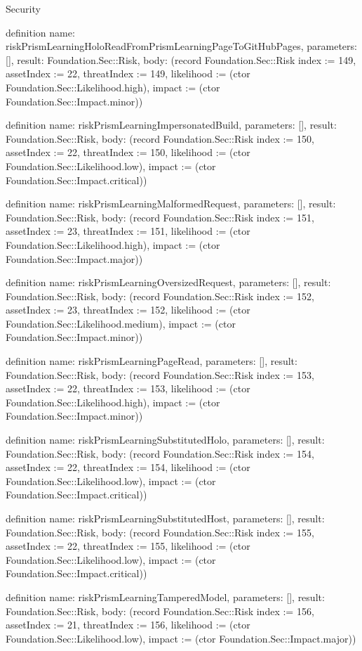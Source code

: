 \begin{lexlean}{Security}
\begin{semanticmodule}
definition{
  name: riskPrismLearningHoloReadFromPrismLearningPageToGitHubPages,
  parameters: [],
  result: Foundation.Sec::Risk,
  body: (record Foundation.Sec::Risk {index := 149, assetIndex := 22, threatIndex := 149, likelihood := (ctor Foundation.Sec::Likelihood.high), impact := (ctor Foundation.Sec::Impact.minor)})
}

definition{
  name: riskPrismLearningImpersonatedBuild,
  parameters: [],
  result: Foundation.Sec::Risk,
  body: (record Foundation.Sec::Risk {index := 150, assetIndex := 22, threatIndex := 150, likelihood := (ctor Foundation.Sec::Likelihood.low), impact := (ctor Foundation.Sec::Impact.critical)})
}

definition{
  name: riskPrismLearningMalformedRequest,
  parameters: [],
  result: Foundation.Sec::Risk,
  body: (record Foundation.Sec::Risk {index := 151, assetIndex := 23, threatIndex := 151, likelihood := (ctor Foundation.Sec::Likelihood.high), impact := (ctor Foundation.Sec::Impact.major)})
}

definition{
  name: riskPrismLearningOversizedRequest,
  parameters: [],
  result: Foundation.Sec::Risk,
  body: (record Foundation.Sec::Risk {index := 152, assetIndex := 23, threatIndex := 152, likelihood := (ctor Foundation.Sec::Likelihood.medium), impact := (ctor Foundation.Sec::Impact.minor)})
}

definition{
  name: riskPrismLearningPageRead,
  parameters: [],
  result: Foundation.Sec::Risk,
  body: (record Foundation.Sec::Risk {index := 153, assetIndex := 22, threatIndex := 153, likelihood := (ctor Foundation.Sec::Likelihood.high), impact := (ctor Foundation.Sec::Impact.minor)})
}

definition{
  name: riskPrismLearningSubstitutedHolo,
  parameters: [],
  result: Foundation.Sec::Risk,
  body: (record Foundation.Sec::Risk {index := 154, assetIndex := 22, threatIndex := 154, likelihood := (ctor Foundation.Sec::Likelihood.low), impact := (ctor Foundation.Sec::Impact.critical)})
}

definition{
  name: riskPrismLearningSubstitutedHost,
  parameters: [],
  result: Foundation.Sec::Risk,
  body: (record Foundation.Sec::Risk {index := 155, assetIndex := 22, threatIndex := 155, likelihood := (ctor Foundation.Sec::Likelihood.low), impact := (ctor Foundation.Sec::Impact.critical)})
}

definition{
  name: riskPrismLearningTamperedModel,
  parameters: [],
  result: Foundation.Sec::Risk,
  body: (record Foundation.Sec::Risk {index := 156, assetIndex := 21, threatIndex := 156, likelihood := (ctor Foundation.Sec::Likelihood.low), impact := (ctor Foundation.Sec::Impact.major)})
}


\end{semanticmodule}
\end{lexlean}
